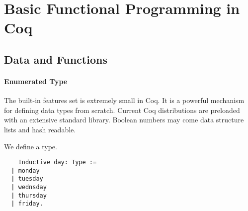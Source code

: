 
\section{Basic Functional Programming in Coq}

\subsection{Data and Functions}
 \paragraph{Enumerated Type}
  The built-in features set is extremely small in Coq. It is a powerful mechanism for defining data types from scratch. Current Coq distributions are preloaded with an extensive standard library.
   Boolean numbers may come data structure lists and hash readable. 
  \begin{example}
  We define a type.  
  \begin{lstlisting}
    Inductive day: Type :=
  | monday
  | tuesday
  | wednsday
  | thursday
  | friday.
  \end{lstlisting}
  \end{example}



